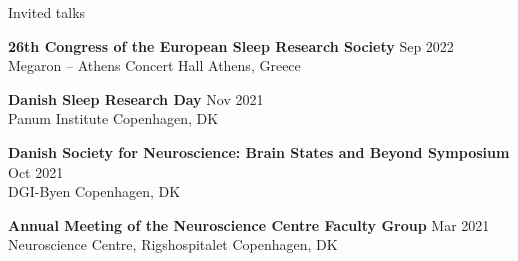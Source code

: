 
\begin{rSection}{Invited talks}

    {\bf 26th Congress of the European Sleep Research Society} \hfill {Sep 2022} \\
	Megaron – Athens Concert Hall \hfill {Athens, Greece}

    {\bf Danish Sleep Research Day} \hfill {Nov 2021} \\
	Panum Institute \hfill {Copenhagen, DK}

    {\bf Danish Society for Neuroscience: Brain States and Beyond Symposium} \hfill {Oct 2021} \\
    DGI-Byen \hfill {Copenhagen, DK}
    
    {\bf Annual Meeting of the Neuroscience Centre Faculty Group} \hfill {Mar 2021} \\
	Neuroscience Centre, Rigshospitalet \hfill {Copenhagen, DK}

\end{rSection}
